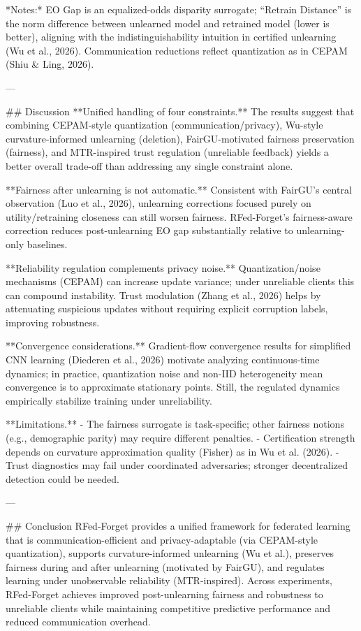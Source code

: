 *Notes:* EO Gap is an equalized-odds disparity surrogate; “Retrain Distance” is the norm difference between unlearned model and retrained model (lower is better), aligning with the indistinguishability intuition in certified unlearning (Wu et al., 2026). Communication reductions reflect quantization as in CEPAM (Shiu & Ling, 2026).

---

## Discussion  
**Unified handling of four constraints.** The results suggest that combining CEPAM-style quantization (communication/privacy), Wu-style curvature-informed unlearning (deletion), FairGU-motivated fairness preservation (fairness), and MTR-inspired trust regulation (unreliable feedback) yields a better overall trade-off than addressing any single constraint alone.

**Fairness after unlearning is not automatic.** Consistent with FairGU’s central observation (Luo et al., 2026), unlearning corrections focused purely on utility/retraining closeness can still worsen fairness. RFed-Forget’s fairness-aware correction reduces post-unlearning EO gap substantially relative to unlearning-only baselines.

**Reliability regulation complements privacy noise.** Quantization/noise mechanisms (CEPAM) can increase update variance; under unreliable clients this can compound instability. Trust modulation (Zhang et al., 2026) helps by attenuating suspicious updates without requiring explicit corruption labels, improving robustness.

**Convergence considerations.** Gradient-flow convergence results for simplified CNN learning (Diederen et al., 2026) motivate analyzing continuous-time dynamics; in practice, quantization noise and non-IID heterogeneity mean convergence is to approximate stationary points. Still, the regulated dynamics empirically stabilize training under unreliability.

**Limitations.**  
- The fairness surrogate is task-specific; other fairness notions (e.g., demographic parity) may require different penalties.  
- Certification strength depends on curvature approximation quality (Fisher) as in Wu et al. (2026).  
- Trust diagnostics may fail under coordinated adversaries; stronger decentralized detection could be needed.

---

## Conclusion  
RFed-Forget provides a unified framework for federated learning that is communication-efficient and privacy-adaptable (via CEPAM-style quantization), supports curvature-informed unlearning (Wu et al.), preserves fairness during and after unlearning (motivated by FairGU), and regulates learning under unobservable reliability (MTR-inspired). Across experiments, RFed-Forget achieves improved post-unlearning fairness and robustness to unreliable clients while maintaining competitive predictive performance and reduced communication overhead.

